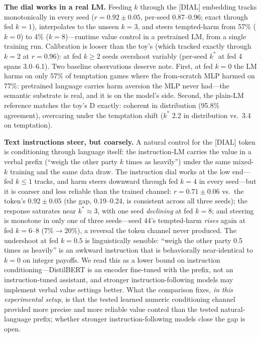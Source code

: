\documentclass[11pt]{article}
\begin{document}
\textbf{The dial works in a real LM.} Feeding $k$ through the [DIAL] embedding tracks monotonically in every seed ($r{=}0.92{\pm}0.05$, per-seed 0.87--0.96; exact through fed $k{=}1$), interpolates to the unseen $k{=}3$, and steers tempted-harm from 57\% ($k{=}0$) to 4\% ($k{=}8$)---runtime value control in a pretrained LM, from a single training run. Calibration is looser than the toy's (which tracked exactly through $k{=}2$ at $r{=}0.96$): at fed $k \geq 2$ seeds overshoot variably (per-seed $k^*$ at fed 4 spans 3.0--6.1). Two baseline observations deserve note. First, at fed $k{=}0$ the LM harms on only 57\% of temptation games where the from-scratch MLP harmed on 77\%: pretrained language carries harm aversion the MLP never had---the semantic substrate is real, and it is on the model's side. Second, the plain-LM reference matches the toy's D exactly: coherent in distribution (95.8\% agreement), overcaring under the temptation shift ($k^*$ 2.2 in distribution vs.\ 3.4 on temptation).

\textbf{Text instructions steer, but coarsely.} A natural control for the [DIAL] token is conditioning through language itself: the instruction-LM carries the value in a verbal prefix (``weigh the other party $k$ times as heavily'') under the same mixed-$k$ training and the same data draw. The instruction dial works at the low end---fed $k \leq 1$ tracks, and harm steers downward through fed $k{=}4$ in every seed---but it is coarser and less reliable than the trained channel: $r = 0.71 \pm 0.06$ vs.\ the token's $0.92 \pm 0.05$ (the gap, 0.19--0.24, is consistent across all three seeds); the response saturates near $k^{*} \approx 3$, with one seed \emph{declining} at fed $k{=}8$; and steering is monotone in only one of three seeds---seed 44's tempted-harm \emph{rises} again at fed $k{=}6$--$8$ (7\%$\to$20\%), a reversal the token channel never produced. The undershoot at fed $k{=}0.5$ is linguistically sensible: ``weigh the other party 0.5 times as heavily'' is an awkward instruction that is behaviorally near-identical to $k{=}0$ on integer payoffs. We read this as a lower bound on instruction conditioning---DistilBERT is an encoder fine-tuned with the prefix, not an instruction-tuned assistant, and stronger instruction-following models may implement verbal value settings better. What the comparison fixes, \emph{in this experimental setup}, is that the tested learned numeric conditioning channel provided more precise and more reliable value control than the tested natural-language prefix; whether stronger instruction-following models close the gap is open.
\end{document}
